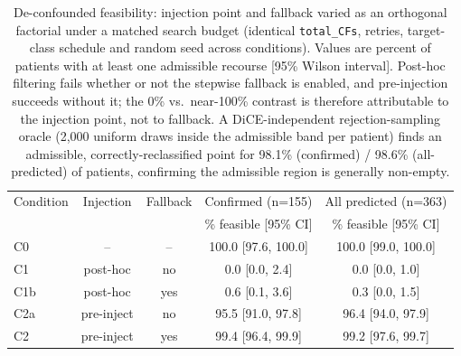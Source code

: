 \begin{table}[ht]
\centering
\caption{De-confounded feasibility: injection point and fallback varied as an
orthogonal factorial under a matched search budget (identical \texttt{total\_CFs},
retries, target-class schedule and random seed across conditions). Values are
percent of patients with at least one admissible recourse [95\% Wilson interval].
Post-hoc filtering fails whether or not the stepwise fallback is enabled, and
pre-injection succeeds without it; the 0\% vs.\ near-100\% contrast is therefore
attributable to the injection point, not to fallback. A DiCE-independent
rejection-sampling oracle (2{,}000 uniform draws inside the admissible band per
patient) finds an admissible, correctly-reclassified point for 98.1\% (confirmed) / 98.6\% (all-predicted) of
patients, confirming the admissible region is generally non-empty.}
\label{tab:deconfounded}
\begin{tabular}{lcccc}
\toprule
Condition & Injection & Fallback & Confirmed (n=155) & All predicted (n=363) \\
 & & & \% feasible [95\% CI] & \% feasible [95\% CI] \\
\midrule
  C0 & -- & -- & 100.0 [97.6, 100.0] & 100.0 [99.0, 100.0] \\
  C1 & post-hoc & no & 0.0 [0.0, 2.4] & 0.0 [0.0, 1.0] \\
  C1b & post-hoc & yes & 0.6 [0.1, 3.6] & 0.3 [0.0, 1.5] \\
  C2a & pre-inject & no & 95.5 [91.0, 97.8] & 96.4 [94.0, 97.9] \\
  C2 & pre-inject & yes & 99.4 [96.4, 99.9] & 99.2 [97.6, 99.7] \\
\bottomrule
\end{tabular}
\end{table}
